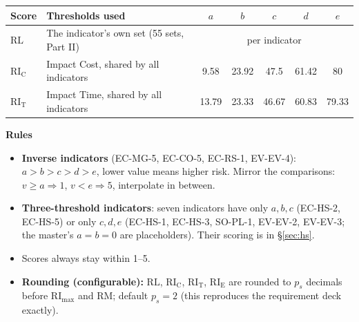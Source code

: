 \documentclass[10pt,a4paper]{article}
\newcommand{\RL}{\mathrm{RL}}\newcommand{\RIC}{\mathrm{RI_C}}\newcommand{\RIT}{\mathrm{RI_T}}\newcommand{\RIE}{\mathrm{RI_E}}
\newcommand{\RImax}{\mathrm{RI}_{\max}}\newcommand{\RM}{\mathrm{RM}}
\begin{document}
\begin{tabularx}{\linewidth}{@{}l X ccccc@{}}\toprule
Score & Thresholds used & $a$ & $b$ & $c$ & $d$ & $e$\\\midrule
$\RL$ & The indicator's own set (55 sets, Part II) & \multicolumn{5}{c}{per indicator}\\
$\RIC$ & Impact Cost, shared by all indicators & 9.58 & 23.92 & 47.5 & 61.42 & 80\\
$\RIT$ & Impact Time, shared by all indicators & 13.79 & 23.33 & 46.67 & 60.83 & 79.33\\\bottomrule
\end{tabularx}

\medskip
\textbf{Rules}
\begin{itemize}[leftmargin=1.4em,labelwidth=1em,align=left]
\item[•] \textbf{Inverse indicators} (EC-MG-5, EC-CO-5, EC-RS-1, EV-EV-4): $a>b>c>d>e$, lower value means higher risk. Mirror the comparisons: $v\ge a\Rightarrow1$, $v<e\Rightarrow5$, interpolate in between.
\item[•] \textbf{Three-threshold indicators}: seven indicators have only $a,b,c$ (EC-HS-2, EC-HS-5) or only $c,d,e$ (EC-HS-1, EC-HS-3, SO-PL-1, EV-EV-2, EV-EV-3; the master's $a=b=0$ are placeholders). Their scoring is in §\ref{sec:hs}.
\item[•] Scores always stay within 1--5.
\item[•] \textbf{Rounding (configurable):} $\RL$, $\RIC$, $\RIT$, $\RIE$ are rounded to $p_s$ decimals before $\RImax$ and $\RM$; default $p_s=2$ (this reproduces the requirement deck exactly).
\end{itemize}
\end{document}
